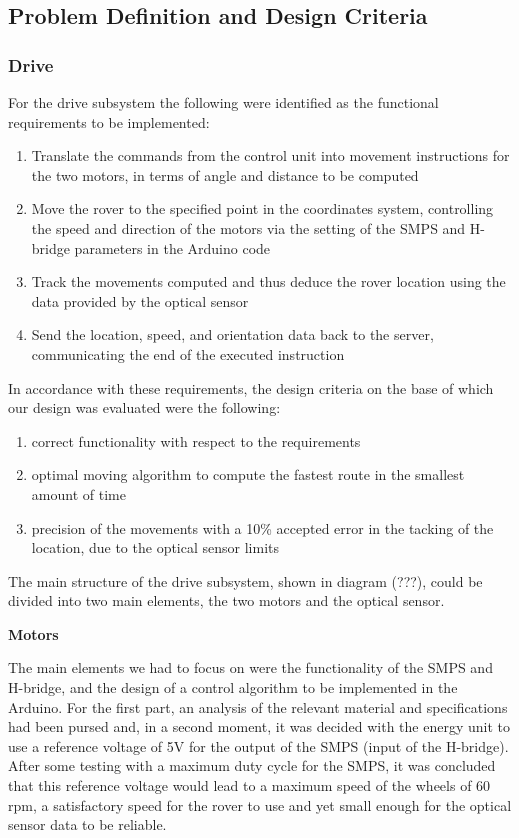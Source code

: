 \documentclass[10pt,twoside]{article}
\begin{document}
\newpage

\subsection{Problem Definition and Design Criteria}

\subsubsection{Drive}

For the drive subsystem the following were identified as the functional requirements to be implemented: 
\begin{enumerate} %
    \item Translate the commands from the control unit into movement instructions for the two motors, in terms of angle and distance to be computed
    \item Move the rover to the specified point in the coordinates system, controlling the speed and direction of the motors via the setting of the SMPS and H-bridge parameters in the Arduino code
    \item Track the movements computed and thus deduce the rover location using the data provided by the optical sensor
    \item Send the location, speed, and orientation data back to the server, communicating the end of the executed instruction
\end{enumerate}
In accordance with these requirements, the design criteria on the base of which our design was evaluated were the following:
\begin{enumerate}
    \item correct functionality with respect to the requirements
    \item optimal moving algorithm to compute the fastest route in the smallest amount of time
    \item precision of the movements with a 10\% accepted error in the tacking of the location, due to the optical sensor limits
\end{enumerate}
The main structure of the drive subsystem, shown in diagram (???), could be divided into two main elements, the two motors and the optical sensor.

\textbf{Motors}

The main elements we had to focus on were the functionality of the SMPS and H-bridge, and the design of a control algorithm to be implemented in the Arduino. For the first part, an analysis of the relevant material and specifications had been pursed and, in a second moment, it was decided with the energy unit to use a reference voltage of 5V for the output of the SMPS (input of the H-bridge). After some testing with a maximum duty cycle for the SMPS, it was concluded that this reference voltage would lead to a maximum speed of the wheels of 60 rpm, a satisfactory speed for the rover to use and yet small enough for the optical sensor data to be reliable.
\end{document}
